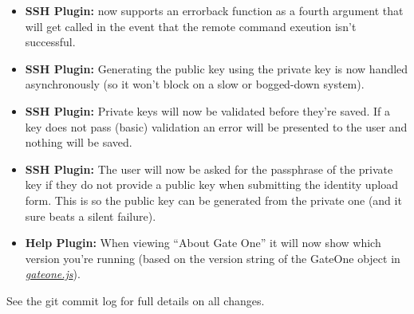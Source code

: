 \documentclass[letterpaper,10pt,openany]{sphinxmanual}
\begin{document}
\begin{itemize}
\item {} 
\textbf{SSH Plugin:}   now supports an errorback function as a fourth argument that will get called in the event that the remote command exeution isn't successful.

\item {} 
\textbf{SSH Plugin:}  Generating the public key using the private key is now handled asynchronously (so it won't block on a slow or bogged-down system).

\item {} 
\textbf{SSH Plugin:}  Private keys will now be validated before they're saved.  If a key does not pass (basic) validation an error will be presented to the user and nothing will be saved.

\item {} 
\textbf{SSH Plugin:}  The user will now be asked for the passphrase of the private key if they do not provide a public key when submitting the identity upload form.  This is so the public key can be generated from the private one (and it sure beats a silent failure).

\item {} 
\textbf{Help Plugin:}  When viewing ``About Gate One'' it will now show which version you're running (based on the version string of the GateOne object in {\hyperref[Developer/js_gateone:gateone-javascript]{\emph{gateone.js}}}).

\end{itemize}

See the git commit log for full details on all changes.
\end{document}
